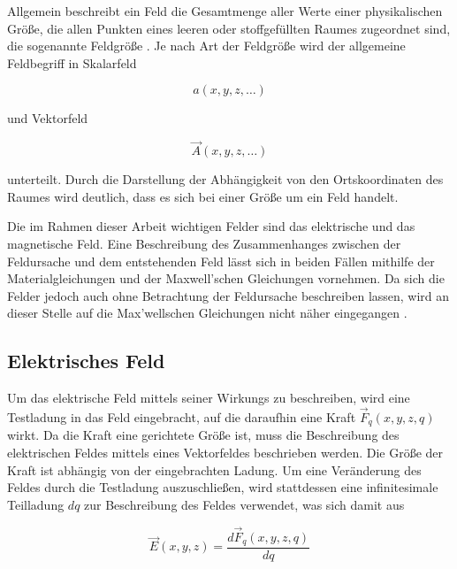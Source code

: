 
Allgemein beschreibt ein Feld die Gesamtmenge aller Werte einer physikalischen Größe, die allen Punkten eines leeren oder stoffgefüllten Raumes zugeordnet sind, die sogenannte Feldgröße \cite{Spektrum.de_Feld}. Je nach Art der Feldgröße wird der allgemeine Feldbegriff in Skalarfeld 

\begin{equation}
    a(x,y,z, \ldots)    
\end{equation}


und Vektorfeld 

\begin{equation}
    \vec A(x,y,z,\ldots)
\end{equation}

unterteilt. Durch die Darstellung der Abhängigkeit von den Ortskoordinaten des Raumes wird deutlich, dass es sich bei einer Größe um ein Feld handelt. \par
\vspace{\baselineskip}
Die im Rahmen dieser Arbeit wichtigen Felder sind das elektrische und das magnetische Feld. Eine Beschreibung des Zusammenhanges zwischen der Feldursache und dem entstehenden Feld lässt sich in beiden Fällen mithilfe der Materialgleichungen und der Maxwell'schen Gleichungen vornehmen. Da sich die Felder jedoch auch ohne Betrachtung der Feldursache beschreiben lassen, wird an dieser Stelle auf die Max'wellschen Gleichungen nicht näher eingegangen \cite{EM_Schirmung}. 


\subsection{Elektrisches Feld}\label{cha:2_sub_Elektrisches_Feld}

Um das elektrische Feld mittels seiner Wirkungs zu beschreiben, wird eine Testladung in das Feld eingebracht, auf die daraufhin eine Kraft $\vec F_q(x,y,z,q)$ wirkt. Da die Kraft eine gerichtete Größe ist, muss die Beschreibung des elektrischen Feldes mittels eines Vektorfeldes beschrieben werden. Die Größe der Kraft ist abhängig von der eingebrachten Ladung. Um eine Veränderung des Feldes durch die Testladung auszuschließen, wird stattdessen eine infinitesimale Teilladung $dq$ zur Beschreibung des Feldes verwendet, was sich damit aus

\begin{equation}
    \vec E (x,y,z) = \frac{d\vec F_q(x,y,z,q)}{dq}
\end{equation}

